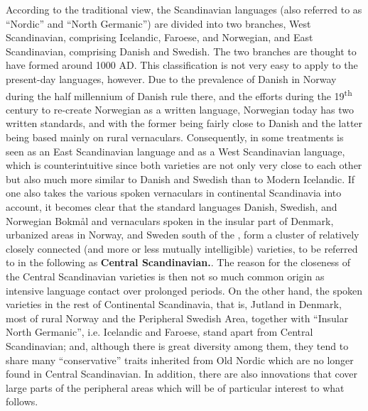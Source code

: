According to the traditional view, the Scandinavian languages (also referred to as “Nordic” and “North Germanic”) are divided into two branches, West Scandinavian, comprising Icelandic, Faroese, and Norwegian, and East Scandinavian, comprising Danish and Swedish. The two branches are thought to have formed around 1000 AD. This classification is not very easy to apply to the present-day languages, however. Due to the prevalence of Danish in Norway during the half millennium of Danish rule there, and the efforts during the 19\textsuperscript{th} century to re-create Norwegian as a written language, Norwegian today has two written standards,  and  with the former being fairly close to Danish and the latter being based mainly on rural vernaculars. Consequently, in some treatments  is seen as an East Scandinavian language and  as a West Scandinavian language, which is counterintuitive since both varieties are not only very close to each other but also much more similar to Danish and Swedish than to Modern Icelandic. If one also takes the various spoken vernaculars in continental Scandinavia into account, it becomes clear that the standard languages Danish, Swedish, and Norwegian Bokmål and vernaculars spoken in the insular part of Denmark, urbanized areas in Norway, and Sweden south of the , form a cluster of relatively closely connected (and more or less mutually intelligible) varieties, to be referred to in the following as \textbf{Central Scandinavian}\textbf{.}. The reason for the closeness of the Central Scandinavian varieties is then not so much common origin as intensive language contact over prolonged periods. On the other hand, the spoken varieties in the rest of Continental Scandinavia, that is, Jutland in Denmark, most of rural Norway and the Peripheral Swedish Area, together with “Insular North Germanic”, i.e. Icelandic and Faroese, stand apart from Central Scandinavian; and, although there is great diversity among them, they tend to share many “conservative” traits inherited from Old Nordic which are no longer found in Central Scandinavian. In addition, there are also innovations that cover large parts of the peripheral areas which will be of particular interest to what follows. 


